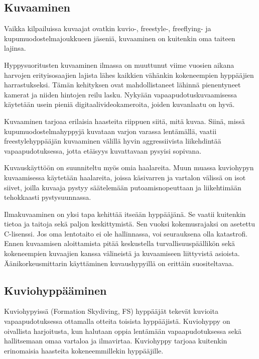 \subsection{ Kuvaaminen  }
\label{erikoishypyt-kuvaaminen}


Vaikka kilpailuissa kuvaajat ovatkin kuvio\mbox{-,} freestyle\mbox{-,} freeflying- ja kupumuodostelmajoukkueen jäseniä, kuvaaminen on kuitenkin oma taiteen lajinsa. 


Hyppysuoritusten kuvaaminen ilmassa on muuttunut viime vuosien aikana harvojen erityisosaajien lajista lähes kaikkien vähänkin kokeneempien hyppääjien harrastukseksi. Tämän kehityksen ovat mahdollistaneet lähinnä pienentyneet kamerat ja niiden hintojen reilu lasku. Nykyään vapaapudotuskuvaamisessa käytetään usein pieniä digitaalivideokameroita, joiden kuvanlaatu on hyvä. 


Kuvaaminen tarjoaa erilaisia haasteita riippuen siitä, mitä kuvaa. Siinä, missä kupumuodostelmahyppyjä kuvataan varjon varassa lentämällä, vaatii freestylehyppääjän kuvaaminen välillä hyvin aggressiivista liikehdintää vapaapudotuksessa, jotta etäisyys kuvattavaan pysyisi sopivana. 


Kuvauskäyttöön on suunniteltu myös omia haalareita. Muun muassa kuviohypyn kuvaamisessa käytetään haalareita, joissa käsivarren ja vartalon välissä on isot siivet, joilla kuvaaja pystyy säätelemään putoamisnopeuttaan ja liikehtimään tehokkaasti pystysuunnassa. 


Ilmakuvaaminen on yksi tapa kehittää itseään hyppääjänä. Se vaatii kuitenkin tietoa ja taitoja sekä paljon keskittymistä. Sen vuoksi kokemusrajaksi on asetettu C-lisenssi. Jos oma lentotaito ei ole hallinnassa, voi seurauksena olla katastrofi. Ennen kuvaamisen aloittamista pitää keskustella turvallisuuspäällikön sekä kokeneempien kuvaajien kanssa välineistä ja kuvaamiseen liittyvistä asioista. Äänikorkeusmittarin käyttäminen kuvaushypyillä on erittäin suositeltavaa. 

\subsection{ Kuviohyppääminen }
\label{erikoishypyt-kuviohyppaaminen}


Kuviohypyissä (Formation Skydiving, FS) hyppääjät tekevät kuvioita vapaapudotuksessa ottamalla otteita toisista hyppääjistä. Kuviohyppy on oivallista harjoitusta, kun halutaan oppia lentämään vapaapudotuksessa sekä hallitsemaan omaa vartaloa ja ilmavirtaa. Kuviohyppy tarjoaa kuitenkin erinomaisia haasteita kokeneemmillekin hyppääjille. 


